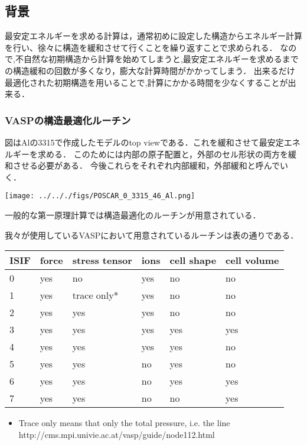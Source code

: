 \documentclass[11pt,dvipdfmx]{jsarticle}
\providecommand{\tightlist}{%
      \setlength{\itemsep}{0pt}\setlength{\parskip}{0pt}}
\begin{document}
    \subsection{背景}\label{ux80ccux666f}

最安定エネルギーを求める計算は，通常初めに設定した構造からエネルギー計算を行い、徐々に構造を緩和させて行くことを繰り返すことで求められる．
なので,不自然な初期構造から計算を始めてしまうと,最安定エネルギーを求めるまでの構造緩和の回数が多くなり，膨大な計算時間がかかってしまう．
出来るだけ最適化された初期構造を用いることで,計算にかかる時間を少なくすることが出来る．

    \subsubsection{VASPの構造最適化ルーチン}\label{vaspux306eux69cbux9020ux6700ux9069ux5316ux30ebux30fcux30c1ux30f3}

図はAlの3315で作成したモデルのtop
viewである．これを緩和させて最安定エネルギーを求める．
このためには内部の原子配置と，外部のセル形状の両方を緩和させる必要がある．
今後これらをそれぞれ内部緩和，外部緩和と呼んでいく．

\begin{center}
\texttt{[image: ../.././figs/POSCAR\_0\_3315\_46\_Al.png]}
\end{center}
一般的な第一原理計算では構造最適化のルーチンが用意されている．

\label{fig:This}
我々が使用しているVASPにおいて用意されているルーチンは表の通りである．

\begin{longtable}[]{@{}llllll@{}}
\toprule
ISIF & force & stress tensor & ions & cell shape & cell
volume\tabularnewline
\midrule
\endhead
0 & yes & no & yes & no & no\tabularnewline
1 & yes & trace only* & yes & no & no\tabularnewline
2 & yes & yes & yes & no & no\tabularnewline
3 & yes & yes & yes & yes & yes\tabularnewline
4 & yes & yes & yes & yes & no\tabularnewline
5 & yes & yes & no & yes & no\tabularnewline
6 & yes & yes & no & yes & yes\tabularnewline
7 & yes & yes & no & no & yes\tabularnewline
\bottomrule
\end{longtable}

\begin{itemize}
\tightlist
\item
  Trace only means that only the total pressure, i.e. the line
  http://cms.mpi.univie.ac.at/vasp/guide/node112.html
\end{itemize}
\end{document}
